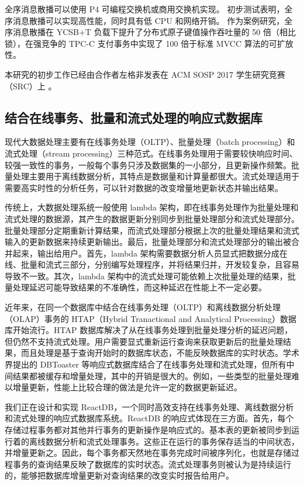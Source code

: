 全序消息散播可以使用 P4 可编程交换机或商用交换机实现。
初步测试表明，全序消息散播可以实现高性能，同时具有低 CPU 和网络开销。
作为案例研究，全序消息散播在 YCSB+T 负载下提升了分布式原子键值操作吞吐量的 50 倍（相比锁），在强竞争的 TPC-C 支付事务中实现了 100 倍于标准 MVCC 算法的可扩放性。

本研究的初步工作已经由合作者左格非发表在 ACM SOSP 2017 学生研究竞赛（SRC）上 \cite{toms}。

\subsection{结合在线事务、批量和流式处理的响应式数据库}

现代大数据处理主要有在线事务处理（OLTP）、批量处理（batch processing）和流式处理（stream processing）三种范式。在线事务处理用于需要较快响应时间、较强一致性的事务，一般每个事务只涉及数据集的一小部分，且更新操作频繁。批量处理主要用于离线数据分析，其特点是数据量和计算量都很大。流式处理适用于需要高实时性的分析任务，可以针对数据的改变增量地更新状态并输出结果。

传统上，大数据处理系统一般使用 lambda 架构，即在线事务处理作为批量处理和流式处理的数据源，其产生的数据更新分别同步到批量处理部分和流式处理部分。批量处理部分定期重新计算结果，而流式处理部分根据上次的批量处理结果和流式输入的更新数据来持续更新输出。最后，批量处理部分和流式处理部分的输出被合并起来，输出给用户。首先，lambda 架构需要数据分析人员显式把数据分成在线、批量和流式三部分，分别编写处理程序，并将结果归并，开发较复杂，且容易导致不一致。其次，lambda 架构中的流式处理可能依赖上次批量处理的结果，批量处理延迟可能导致结果的不准确性，而这种延迟在性能上不一定必要。

近年来，在同一个数据库中结合在线事务处理（OLTP）和离线数据分析处理（OLAP）事务的 HTAP（Hybrid Tranactional and Analytical Processing）数据库开始流行。HTAP 数据库解决了从在线事务处理到批量处理分析的延迟问题，但仍然不支持流式处理。用户需要显式重新运行查询来获取更新后的批量处理结果，而且处理是基于查询开始时的数据库状态，不能反映数据库的实时状态。学术界提出的 DBToaster 等响应式数据库结合了在线事务处理和流式处理，但所有中间结果都被缓存和增量处理，其中的开销是很大的。例如，一些类型的批量处理难以增量更新，性能上比较合理的做法是允许一定的数据更新延迟。

我们正在设计和实现 ReactDB，一个同时高效支持在线事务处理、离线数据分析和流式处理的响应式数据库系统。ReactDB 的响应式体现在三方面。首先，每个存储过程事务都对其他并行事务的更新操作是响应式的。基本表的更新被同步到运行着的离线数据分析和流式处理事务。这些正在运行的事务保存适当的中间状态，并增量更新之。因此，每个事务都天然地在事务完成时间被序列化，也就是存储过程事务的查询结果反映了数据库的实时状态。流式处理事务则被认为是持续运行的，能够把数据库增量更新对查询结果的改变实时报告给用户。

